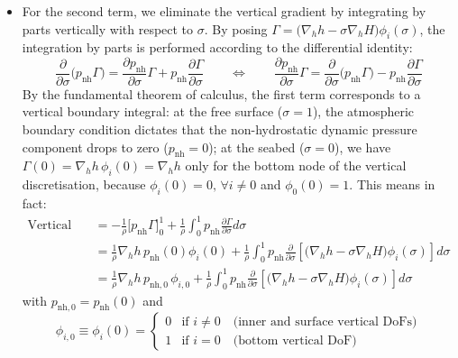 \documentclass{article}
\newcommand{\nablah}{\nabla_h}
\newcommand{\pnh}{p_{\text{nh}}}
\newcommand{\pnhbottom}{p_{\text{nh},0}}
\newcommand{\dds}[1]{\frac{\partial #1}{\partial \sigma}}
\begin{document}
\begin{itemize}
\begin{itemize}[label=$\diamond$]
        \item For the second term, we eliminate the vertical gradient by integrating by parts vertically with respect to $\sigma$. 
        By posing $\Gamma = \big(\nablah h - \sigma \nablah H\big) \phi_i(\sigma)$, the integration by parts is performed according to the differential identity:
        $$\frac{\partial}{\partial \sigma}\Big( \pnh \Gamma\Big) = \dds{\pnh}\Gamma + \pnh\frac{\partial \Gamma}{\partial \sigma} \qquad \Leftrightarrow \qquad \dds{\pnh}\Gamma = \frac{\partial}{\partial \sigma}\Big( \pnh \Gamma\Big) - \pnh\frac{\partial \Gamma}{\partial \sigma} $$
        By the fundamental theorem of calculus, the first term corresponds to a vertical boundary integral: at the free surface ($\sigma = 1$), the atmospheric boundary condition dictates that the non-hydrostatic dynamic pressure component drops to zero ($\pnh = 0$); at the seabed ($\sigma = 0$), we have $\Gamma(0)=\nablah h \,\phi_i(0) = \nablah h$ only for the bottom node of the vertical discretisation, because $\phi_i(0) = 0, \, \forall i \neq 0$ and $\phi_0(0)=1$.  
        This means in fact:
        \begin{align*}
            \text{Vertical gradient} &= - \frac{1}{\rho} \Big[\pnh \Gamma \Big]_0^1+ \frac{1}{\rho} \int_0^1 \pnh \frac{\partial\Gamma}{\partial  \sigma} d\sigma \\[1mm]
            &= \frac{1}{\rho}\nablah h \,\pnh(0) \phi_i(0)+ \frac{1}{\rho} \int_0^1 \pnh \frac{\partial}{\partial \sigma} \left[ \Big(\nablah h - \sigma \nablah H\Big) \phi_i(\sigma) \right] d\sigma \\[1mm]
            &= \frac{1}{\rho}\nablah h \,\pnhbottom \,\phi_{i,0}+ \frac{1}{\rho} \int_0^1 \pnh \frac{\partial}{\partial \sigma} \left[ \Big(\nablah h - \sigma \nablah H\Big) \phi_i(\sigma) \right] d\sigma
        \end{align*}
        with $\pnhbottom = \pnh(0)$ and 
        \begin{equation}
            \phi_{i,0} \equiv \phi_i(0) = \begin{cases}
                0 & \text{if } i\neq 0 \quad \text{(inner and surface vertical DoFs)}\\[2mm]
                1 & \text{if } i= 0 \quad \text{(bottom vertical DoF)}
            \end{cases}
            \label{eq: def phii0}
        \end{equation}
        

\end{itemize}
\end{itemize}
\end{document}
